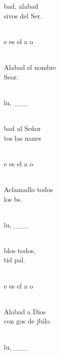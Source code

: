 \begin{cancion}
	bad, alabad\\
	sivos del Ser.\\\jump\\
	\begin{chorus}%
	e es el a  o \\
	\end{chorus}%
	\jump\\
Alabad el nombre \\
	 Seor.\\\jump\\
	\begin{chorus}%
	lu, ___\\
	\end{chorus}%
	\jump\\
	bad al Señor\\
	tos las nanes\\\jump\\
	\begin{chorus}%
	e es el a  o \\
	\end{chorus}%
	\jump\\
Aclamadlo todos\\
	los bs.\\\jump\\
	\begin{chorus}%
	lu, ___\\
	\end{chorus}%
	\jump\\
	blos todos,\\
	tid pal.\\\jump\\
	\begin{chorus}%
	e es el a  o \\
	\end{chorus}%
	\jump\\
Alabad a Dios\\
	con gos de jbilo.\\\jump\\
	\begin{chorus}%
	lu, ___\\
	\end{chorus}%
	\jump\\
\end{cancion}%
